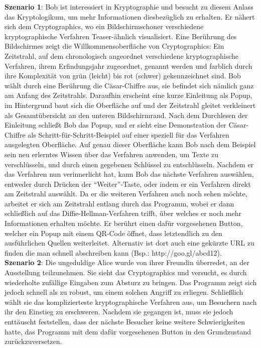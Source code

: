 \documentclass{article}
\begin{document}
\textbf{Szenario 1}:
Bob ist interessiert in Kryptographie und besucht zu diesem Anlass das Kryptologikum, um mehr Informationen diesbezüglich zu erhalten. Er nähert sich dem Cryptographics, wo ein Bildschirmschoner verschiedene kryptographische Verfahren Teaser-ähnlich visualisiert. Eine Berührung des Bildschirmes zeigt die Willkommensoberfläche von Cryptographics: Ein Zeitstrahl, auf dem chronologisch angeordnet verschiedene kryptographische Verfahren, ihrem Erfindungsjahr zugeordnet, genannt werden und farblich durch ihre Komplexität von grün (leicht) bis rot (schwer) gekennzeichnet sind. Bob wählt durch eine Berührung die Cäsar-Chiffre aus, sie befindet sich nämlich ganz am Anfang des Zeitstrahls. Daraufhin erscheint eine kurze Einleitung als Popup, im Hintergrund baut sich die Oberfläche auf und der Zeitstrahl gleitet verkleinert als Gesamtübersicht an den unteren Bildschirmrand. Nach dem Durchlesen der Einleitung schließt Bob das Popup, und er sieht eine Demonstration der Cäsar-Chiffre als Schritt-für-Schritt-Beispiel auf einer speziell für das Verfahren ausgelegten Oberfläche. Auf genau dieser Oberfläche kann Bob nach dem Beispiel sein neu erlerntes Wissen über das Verfahren anwenden, um Texte zu verschlüsseln, und durch einen gegebenen Schlüssel zu entschlüsseln. Nachdem er das Verfahren nun verinnerlicht hat, kann Bob das nächste Verfahren auswählen, entweder durch Drücken der “Weiter”-Taste, oder indem er ein Verfahren direkt am Zeitstrahl auswählt. Da er die weiteren Verfahren auch noch sehen möchte, arbeitet er sich am Zeitstrahl entlang durch das Programm, wobei er dann schließlich auf das Diffie-Hellman-Verfahren trifft, über welches er noch mehr Informationen erhalten möchte. Er berührt einen dafür vorgesehenen Button, welcher ein Popup mit einem QR-Code öffnet, dass letztendlich zu den ausführlichen Quellen weiterleitet. Alternativ ist dort auch eine gekürzte URL zu finden die man schnell abschreiben kann (Bsp.: http://goo.gl/abcd12).\\

\textbf{Szenario 2}:
Die ungeduldige Alice wurde von ihrer Freundin überredet, an der Ausstellung teilzunehmen. Sie sieht das Cryptographics und versucht, es durch wiederholte zufällige Eingaben zum Absturz zu bringen. Das Programm zeigt sich jedoch schnell als zu robust, um einem solchen Angriff zu erliegen. Schließlich wählt sie das komplizierteste kryptographische Verfahren aus, um Besuchern nach ihr den Einstieg zu erschweren. Nachdem sie gegangen ist, muss sie jedoch enttäuscht feststellen, dass der nächste Besucher keine weitere Schwierigkeiten hatte, das Programm mit dem dafür vorgesehenen Button in den Grundzustand zurückzuversetzen.\\
\end{document}
